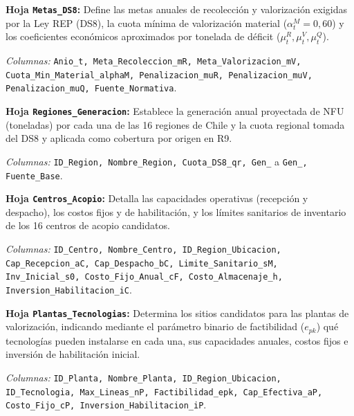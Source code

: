 \documentclass[letterpaper]{article}
\begin{document}
\textbf{Hoja \texttt{Metas\_\allowbreak DS8}:} Define las metas anuales de recolección y valorización exigidas por la Ley REP (DS8), la cuota mínima de valorización material ($\alpha_t^M=0,60$) y los coeficientes económicos aproximados por tonelada de déficit ($\mu_t^R, \mu_t^V, \mu_t^Q$).\\
{\raggedright \textit{Columnas:} \texttt{Anio\_\allowbreak t, Meta\_\allowbreak Recoleccion\_\allowbreak mR, Meta\_\allowbreak Valorizacion\_\allowbreak mV, Cuota\_\allowbreak Min\_\allowbreak Material\_\allowbreak alphaM, Penalizacion\_\allowbreak muR, Penalizacion\_\allowbreak muV, Penalizacion\_\allowbreak muQ, Fuente\_\allowbreak Normativa}.\par}

\textbf{Hoja \texttt{Regiones\_\allowbreak Generacion}:} Establece la generación anual proyectada de NFU (toneladas) por cada una de las 16 regiones de Chile y la cuota regional tomada del DS8 y aplicada como cobertura por origen en R9.\\
{\raggedright \textit{Columnas:} \texttt{ID\_\allowbreak Region, Nombre\_\allowbreak Region, Cuota\_\allowbreak DS8\_\allowbreak qr, Gen\_} a \texttt{Gen\_, Fuente\_\allowbreak Base}.\par}

\textbf{Hoja \texttt{Centros\_\allowbreak Acopio}:} Detalla las capacidades operativas (recepción y despacho), los costos fijos y de habilitación, y los límites sanitarios de inventario de los 16 centros de acopio candidatos.\\
{\raggedright \textit{Columnas:} \texttt{ID\_\allowbreak Centro, Nombre\_\allowbreak Centro, ID\_\allowbreak Region\_\allowbreak Ubicacion, Cap\_\allowbreak Recepcion\_\allowbreak aC, Cap\_\allowbreak Despacho\_\allowbreak bC, Limite\_\allowbreak Sanitario\_\allowbreak sM, Inv\_\allowbreak Inicial\_\allowbreak s0, Costo\_\allowbreak Fijo\_\allowbreak Anual\_\allowbreak cF, Costo\_\allowbreak Almacenaje\_\allowbreak h, Inversion\_\allowbreak Habilitacion\_\allowbreak iC}.\par}

\textbf{Hoja \texttt{Plantas\_\allowbreak Tecnologias}:} Determina los sitios candidatos para las plantas de valorización, indicando mediante el parámetro binario de factibilidad ($e_{pk}$) qué tecnologías pueden instalarse en cada una, sus capacidades anuales, costos fijos e inversión de habilitación inicial.\\
{\raggedright \textit{Columnas:} \texttt{ID\_\allowbreak Planta, Nombre\_\allowbreak Planta, ID\_\allowbreak Region\_\allowbreak Ubicacion, ID\_\allowbreak Tecnologia, Max\_\allowbreak Lineas\_\allowbreak nP, Factibilidad\_\allowbreak epk, Cap\_\allowbreak Efectiva\_\allowbreak aP, Costo\_\allowbreak Fijo\_\allowbreak cP, Inversion\_\allowbreak Habilitacion\_\allowbreak iP}.\par}
\end{document}
